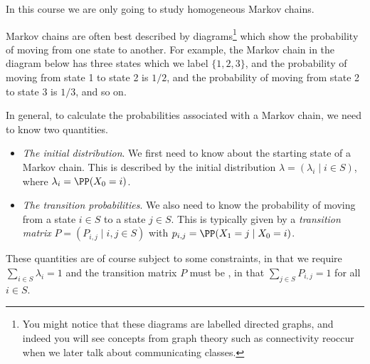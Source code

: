 \documentclass[a4paper]{scrartcl}
\begin{document}
In this course we are only going to study homogeneous Markov chains.

Markov chains are often best described by diagrams\footnote{You might notice that these diagrams are labelled directed graphs, and indeed you will see concepts from graph theory such as connectivity reoccur when we later talk about communicating classes.} which show the probability of moving from one state to another.
For example, the Markov chain in the diagram below has three states which we label $\{1, 2, 3\}$, and the probability of moving from state 1 to state 2 is $1/2$, and the probability of moving from state 2 to state 3 is $1/3$, and so on.

\begin{center}
\end{center}

In general, to calculate the probabilities associated with a Markov chain, we need to know two quantities.

\begin{itemize}
	\item \emph{The initial distribution}. We first need to know about the starting state of a Markov chain. This is described by the initial distribution $\lambda = (\lambda_i \mid i \in S)$, where $\lambda_i = \PP(X_0 = i)$.
	\item \emph{The transition probabilities}. We also need to know the probability of moving from a state $i \in S$ to a state $j \in S$. This is typically given by a \emph{transition matrix} $P = (P_{i, j} \mid i, j \in S)$ with $p_{i,j} = \PP(X_1 = j \mid X_0 = i)$.
\end{itemize}
These quantities are of course subject to some constraints, in that we require $\sum_{i \in S} \lambda_i = 1$ and the transition matrix $P$ must be , in that $\sum_{j \in S} P_{i, j} = 1$ for all $i \in S$.
\end{document}
